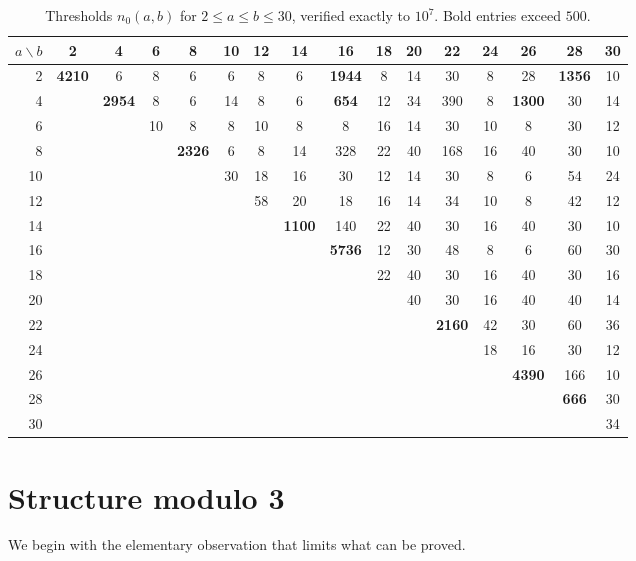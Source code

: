 \documentclass[11pt]{amsart}
\theoremstyle{definition}
\theoremstyle{remark}
\begin{document}
\begin{table}[t]
\centering
\caption{Thresholds $n_0(a,b)$ for $2\le a\le b\le 30$, verified exactly to $10^7$. Bold entries exceed $500$.}
\label{tab:grid}
\small
\setlength{\tabcolsep}{3.2pt}
\begin{tabular}{r*{15}{c}}
\toprule
$a\backslash b$ & 2 & 4 & 6 & 8 & 10 & 12 & 14 & 16 & 18 & 20 & 22 & 24 & 26 & 28 & 30 \\ \midrule
2 & \textbf{4210} & 6 & 8 & 6 & 6 & 8 & 6 & \textbf{1944} & 8 & 14 & 30 & 8 & 28 & \textbf{1356} & 10 \\
4 &  & \textbf{2954} & 8 & 6 & 14 & 8 & 6 & \textbf{654} & 12 & 34 & 390 & 8 & \textbf{1300} & 30 & 14 \\
6 &  &  & 10 & 8 & 8 & 10 & 8 & 8 & 16 & 14 & 30 & 10 & 8 & 30 & 12 \\
8 &  &  &  & \textbf{2326} & 6 & 8 & 14 & 328 & 22 & 40 & 168 & 16 & 40 & 30 & 10 \\
10 &  &  &  &  & 30 & 18 & 16 & 30 & 12 & 14 & 30 & 8 & 6 & 54 & 24 \\
12 &  &  &  &  &  & 58 & 20 & 18 & 16 & 14 & 34 & 10 & 8 & 42 & 12 \\
14 &  &  &  &  &  &  & \textbf{1100} & 140 & 22 & 40 & 30 & 16 & 40 & 30 & 10 \\
16 &  &  &  &  &  &  &  & \textbf{5736} & 12 & 30 & 48 & 8 & 6 & 60 & 30 \\
18 &  &  &  &  &  &  &  &  & 22 & 40 & 30 & 16 & 40 & 30 & 16 \\
20 &  &  &  &  &  &  &  &  &  & 40 & 30 & 16 & 40 & 40 & 14 \\
22 &  &  &  &  &  &  &  &  &  &  & \textbf{2160} & 42 & 30 & 60 & 36 \\
24 &  &  &  &  &  &  &  &  &  &  &  & 18 & 16 & 30 & 12 \\
26 &  &  &  &  &  &  &  &  &  &  &  &  & \textbf{4390} & 166 & 10 \\
28 &  &  &  &  &  &  &  &  &  &  &  &  &  & \textbf{666} & 30 \\
30 &  &  &  &  &  &  &  &  &  &  &  &  &  &  & 34 \\
\bottomrule
\end{tabular}
\end{table}

\section{Structure modulo 3}\label{sec:structure}

We begin with the elementary observation that limits what can be proved.
\end{document}

